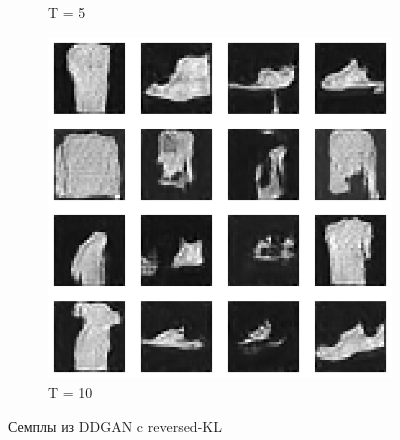 \documentclass{article}
\begin{document}
\begin{figure}[H]
\begin{subfigure}[h]{0.3\linewidth}
		\caption{T = 5}
	\end{subfigure}
	\hfill
	\begin{subfigure}[h]{0.3\linewidth}
		\centering
		\includegraphics[scale=0.3]{../code/figures/generated_DDGAN_rkl_10.png}
		\caption{T = 10}
	\end{subfigure}
	\caption{Семплы из DDGAN c reversed-KL}\label{ddgan_rkl_samples}	
\end{figure}
\end{document}

